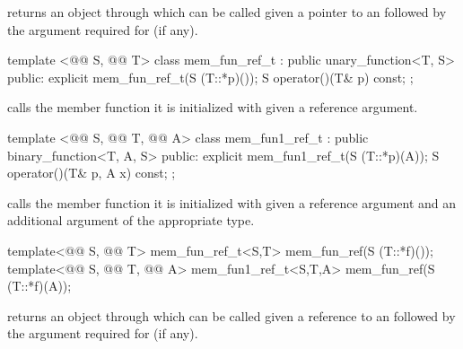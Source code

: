 \documentclass[american,twoside]{book}
\begin{document}
\begin{itemdescr}
\pnum
{} returns an object through which  can be
called given a pointer to an  followed by the argument required for
 (if any).
\end{itemdescr}

%
\begin{itemdecl}
template <@@ S, @@ T> class mem_fun_ref_t
      : public unary_function<T, S> {
public:
  explicit mem_fun_ref_t(S (T::*p)());
  S operator()(T& p) const;
};
\end{itemdecl}

\begin{itemdescr}
\pnum
{} calls the member function it is initialized with given
a reference argument.
\end{itemdescr}

%
\begin{itemdecl}
template <@@ S, @@ T, @@ A> class mem_fun1_ref_t
      : public binary_function<T, A, S> {
public:
  explicit mem_fun1_ref_t(S (T::*p)(A));
  S operator()(T& p, A x) const;
};
\end{itemdecl}

\begin{itemdescr}
\pnum
{} calls the member function it is initialized with
given a reference argument and an additional argument of the appropriate type.
\end{itemdescr}

%
\begin{itemdecl}
template<@@ S, @@ T> mem_fun_ref_t<S,T>
   mem_fun_ref(S (T::*f)());
template<@@ S, @@ T, @@ A> mem_fun1_ref_t<S,T,A>
   mem_fun_ref(S (T::*f)(A));
\end{itemdecl}

\begin{itemdescr}
\pnum
{} returns an object through which 
can be called given a reference to an  followed by the argument
required for  (if any).
\end{itemdescr}
\end{document}

